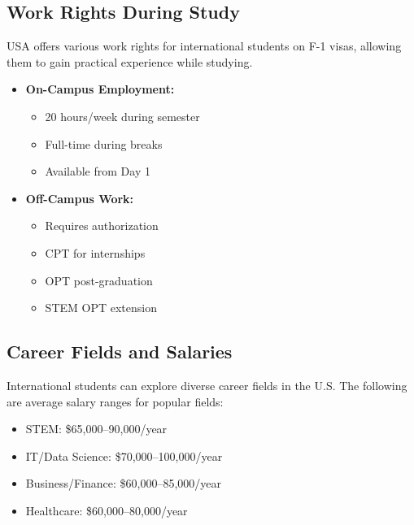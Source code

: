 \subsection{Work Rights During Study}
USA offers various work rights for international students on F-1 visas, allowing them to gain practical experience while studying.
\begin{itemize}
    \item \textbf{On-Campus Employment:}
    \begin{itemize}
        \item 20 hours/week during semester
        \item Full-time during breaks
        \item Available from Day 1
    \end{itemize}
    
    \item \textbf{Off-Campus Work:}
    \begin{itemize}
        \item Requires authorization
        \item CPT for internships
        \item OPT post-graduation
        \item STEM OPT extension
    \end{itemize}
\end{itemize}

\subsection{Career Fields and Salaries}
International students can explore diverse career fields in the U.S. The following are average salary ranges for popular fields:
\begin{itemize}
    \item STEM: \$65,000--90,000/year
    \item IT/Data Science: \$70,000--100,000/year
    \item Business/Finance: \$60,000--85,000/year
    \item Healthcare: \$60,000--80,000/year
\end{itemize}

